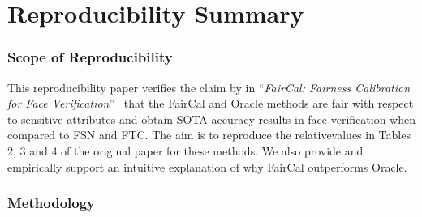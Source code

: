 \section*{\centering Reproducibility Summary}




\subsubsection*{Scope of Reproducibility}



This reproducibility paper verifies the claim by \citeauthor{salvador2022faircal} in ``\textit{FairCal: Fairness Calibration for Face Verification}''~\cite{salvador2022faircal} that the FairCal and Oracle methods are fair with respect to sensitive attributes and obtain SOTA accuracy results in face verification when compared to FSN and FTC.
The aim is to reproduce the relative\break{}values in Tables 2, 3 and 4 of the original paper for these methods.
We also provide and empirically support an intuitive explanation of why FairCal outperforms Oracle.

\subsubsection*{Methodology}


